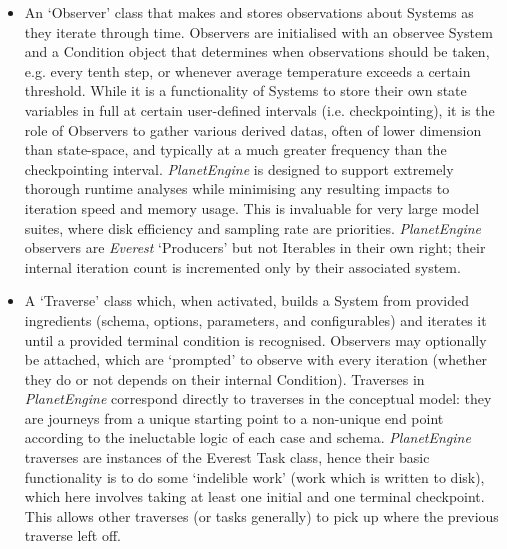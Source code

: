 \documentclass[a4paper,11pt,oneside]{book}
\begin{document}
\begin{itemize}
\item An `Observer' class that makes and stores observations about Systems as they iterate through time. Observers are initialised with an observee System and a Condition object that determines when observations should be taken, e.g. every tenth step, or whenever average temperature exceeds a certain threshold. While it is a functionality of Systems to store their own state variables in full at certain user-defined intervals (i.e. checkpointing), it is the role of Observers to gather various derived datas, often of lower dimension than state-space, and typically at a much greater frequency than the checkpointing interval. \textit{PlanetEngine} is designed to support extremely thorough runtime analyses while minimising any resulting impacts to iteration speed and memory usage. This is invaluable for very large model suites, where disk efficiency and sampling rate are priorities. \textit{PlanetEngine} observers are \textit{Everest} `Producers' but not Iterables in their own right; their internal iteration count is incremented only by their associated system.


\item A `Traverse' class which, when activated, builds a System from provided ingredients (schema, options, parameters, and configurables) and iterates it until a provided terminal condition is recognised. Observers may optionally be attached, which are `prompted' to observe with every iteration (whether they do or not depends on their internal Condition). Traverses in \textit{PlanetEngine} correspond directly to traverses in the conceptual model: they are journeys from a unique starting point to a non-unique end point according to the ineluctable logic of each case and schema. \textit{PlanetEngine} traverses are instances of the Everest Task class, hence their basic functionality is to do some `indelible work' (work which is written to disk), which here involves taking at least one initial and one terminal checkpoint. This allows other traverses (or tasks generally) to pick up where the previous traverse left off.



\end{itemize}
\end{document}

